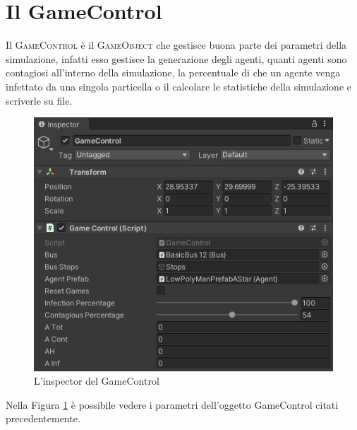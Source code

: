 \documentclass[12pt, openany]{book}
\begin{document}
 	\section{Il GameControl}
 		Il \textsc{GameControl} è il \textsc{GameObject} che gestisce buona parte dei parametri della simulazione,  infatti esso gestisce la generazione degli agenti, quanti agenti sono contagiosi all'interno della simulazione, la percentuale di che un agente venga infettato da una singola particella o il calcolare le statistiche della simulazione e scriverle su file.
 		\begin{figure}[H]
 			\centering
 			\includegraphics[width=1\linewidth]{"Immagini/GameControl.png"}
 			\caption{L'inspector del GameControl}
 			\label{fig:GameControl}
 		\end{figure}
 		Nella Figura \ref{fig:GameControl} è possibile vedere i parametri dell'oggetto GameControl citati precedentemente.
\end{document}
